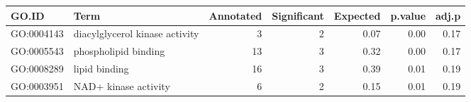 \begin{table}[ht]
\centering
\begin{tabular}{llrrrrr}
  \hline
GO.ID & Term & Annotated & Significant & Expected & p.value & adj.p \\ 
  \hline
GO:0004143 & diacylglycerol kinase activity &   3 &   2 & 0.07 & 0.00 & 0.17 \\ 
  GO:0005543 & phospholipid binding &  13 &   3 & 0.32 & 0.00 & 0.17 \\ 
  GO:0008289 & lipid binding &  16 &   3 & 0.39 & 0.01 & 0.19 \\ 
  GO:0003951 & NAD+ kinase activity &   6 &   2 & 0.15 & 0.01 & 0.19 \\ 
   \hline
\end{tabular}
\end{table}
